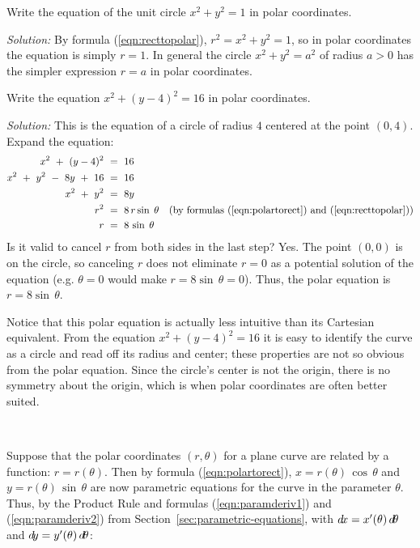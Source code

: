 \begin{exmp}\label{exmp:polarcircle}
 Write the equation of the unit circle $x^2 + y^2 = 1$ in polar
 coordinates.\vspace{1mm}
 \par\noindent\emph{Solution:} By formula (\ref{eqn:recttopolar}),
 $r^2 = x^2 + y^2 = 1$, so in polar coordinates the equation is simply $r = 1$.
 In general the circle $x^2+y^2=a^2$ of radius $a>0$ has the simpler expression
 $r=a$ in polar coordinates.
\end{exmp}
\begin{exmp}
 Write the equation $x^2 + (y-4)^2 = 16$ in polar coordinates.\vspace{1mm}
 \par\noindent\emph{Solution:} This is the equation of a circle of radius $4$
 centered at the point $(0,4)$. Expand the equation:
 \begin{align*}
  x^2 ~+~ (y-4)^2 ~&=~ 16\\
  x^2 ~+~ y^2 ~-~ 8y ~+~ 16 ~&=~ 16\\
  x^2 ~+~ y^2 ~&=~ 8y\\
  r^2 ~&=~ 8\,r\sin\;\theta \quad\text{(by formulas (\ref{eqn:polartorect})
           and (\ref{eqn:recttopolar}))}\\
  r ~&=~ 8\,\sin\;\theta
 \end{align*}
 Is it valid to cancel $r$ from both sides in the last step? Yes. The point
 $(0,0)$ is on the circle, so canceling $r$ does not eliminate $r=0$ as a
 potential solution of the equation (e.g. $\theta=0$ would make
 $r = 8 \sin\,\theta = 0$). Thus, the polar equation is
 $r = 8 \sin\,\theta$.\vspace{1mm}
 
 \noindent Notice that this polar equation is actually less intuitive than its
 Cartesian equivalent. From the equation $x^2 + (y-4)^2 = 16$ it is easy to
 identify the curve as a circle and read off its radius and center; these
 properties are not so obvious from the polar equation. Since the circle's
 center is not the origin, there is no symmetry about the origin, which is when
 polar coordinates are often better suited.
\end{exmp}
\divider
\newpage
\par{}\\
\par Suppose that the polar coordinates $(r,\theta)$ for a plane curve are related by
a function: $r=r(\theta)$. Then by formula (\ref{eqn:polartorect}),
$x=r(\theta)\,\cos\,\theta$ and $y=r(\theta)\,\sin\,\theta$ are now parametric
equations for the curve in the parameter $\theta$. Thus, by the Product Rule
and formulas
(\ref{eqn:paramderiv1}) and (\ref{eqn:paramderiv2}) from Section~\ref{sec:parametric-equations}, with
$d\!x=x'(\theta)\,d\!\theta$ and
$d\!y=y'(\theta)\,d\!\theta$:

